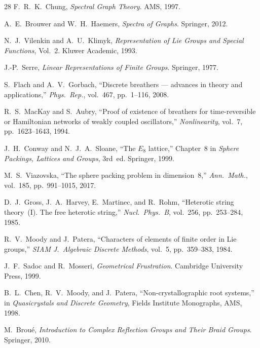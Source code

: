 \documentclass[12pt,a4paper]{article}
\begin{document}
\begin{thebibliography}{28}
F.~R.~K.~Chung,
\textit{Spectral Graph Theory}.
AMS, 1997.

A.~E.~Brouwer and W.~H.~Haemers,
\textit{Spectra of Graphs}.
Springer, 2012.

N.~J.~Vilenkin and A.~U.~Klimyk,
\textit{Representation of Lie Groups and Special Functions}, Vol.~2.
Kluwer Academic, 1993.

J.-P.~Serre,
\textit{Linear Representations of Finite Groups}.
Springer, 1977.

S.~Flach and A.~V.~Gorbach,
``Discrete breathers --- advances in theory and applications,''
\textit{Phys.\ Rep.}, vol.~467, pp.~1--116, 2008.

R.~S.~MacKay and S.~Aubry,
``Proof of existence of breathers for time-reversible or Hamiltonian networks
of weakly coupled oscillators,''
\textit{Nonlinearity}, vol.~7, pp.~1623--1643, 1994.

J.~H.~Conway and N.~J.~A.~Sloane,
``The $E_8$ lattice,'' Chapter~8 in
\textit{Sphere Packings, Lattices and Groups}, 3rd~ed.
Springer, 1999.

M.~S.~Viazovska,
``The sphere packing problem in dimension~8,''
\textit{Ann.\ Math.}, vol.~185, pp.~991--1015, 2017.

D.~J.~Gross, J.~A.~Harvey, E.~Martinec, and R.~Rohm,
``Heterotic string theory~(I). The free heterotic string,''
\textit{Nucl.\ Phys.\ B}, vol.~256, pp.~253--284, 1985.

R.~V.~Moody and J.~Patera,
``Characters of elements of finite order in Lie groups,''
\textit{SIAM J.\ Algebraic Discrete Methods}, vol.~5, pp.~359--383, 1984.

J.~F.~Sadoc and R.~Mosseri,
\textit{Geometrical Frustration}.
Cambridge University Press, 1999.

B.~L.~Chen, R.~V.~Moody, and J.~Patera,
``Non-crystallographic root systems,'' in
\textit{Quasicrystals and Discrete Geometry},
Fields Institute Monographs, AMS, 1998.

M.~Brou\'e,
\textit{Introduction to Complex Reflection Groups and Their Braid Groups}.
Springer, 2010.

\end{thebibliography}


\appendix
\end{document}
